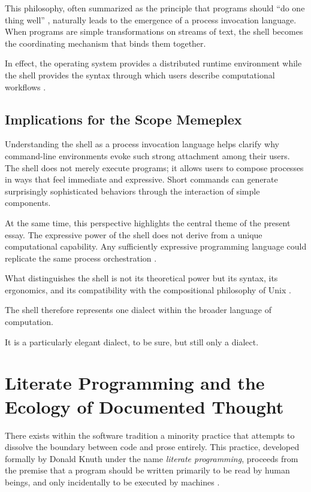 \documentclass[11pt]{article}
\theoremstyle{definition}
\begin{document}
This philosophy, often summarized as the principle that programs should
``do one thing well'' \cite{raymond2003}, naturally leads to the emergence
of a process invocation language. When programs are simple
transformations on streams of text, the shell becomes the coordinating
mechanism that binds them together.

In effect, the operating system provides a distributed runtime
environment while the shell provides the syntax through which users
describe computational workflows \cite{hoare1985}.

\subsection{Implications for the Scope Memeplex}

Understanding the shell as a process invocation language helps clarify
why command-line environments evoke such strong attachment among their
users. The shell does not merely execute programs; it allows users to
compose processes in ways that feel immediate and expressive. Short
commands can generate surprisingly sophisticated behaviors through the
interaction of simple components.

At the same time, this perspective highlights the central theme of the
present essay. The expressive power of the shell does not derive from a
unique computational capability. Any sufficiently expressive programming
language could replicate the same process orchestration \cite{kleene1952}.

What distinguishes the shell is not its theoretical power but its
syntax, its ergonomics, and its compatibility with the compositional
philosophy of Unix \cite{raymond2003}.

The shell therefore represents one dialect within the broader language
of computation.

It is a particularly elegant dialect, to be sure, but still only a
dialect.

\section{Literate Programming and the Ecology of Documented Thought}

There exists within the software tradition a minority practice that
attempts to dissolve the boundary between code and prose entirely. This
practice, developed formally by Donald Knuth under the name
\emph{literate programming}, proceeds from the premise that a program
should be written primarily to be read by human beings, and only
incidentally to be executed by machines \cite{knuth1984}.
\end{document}

